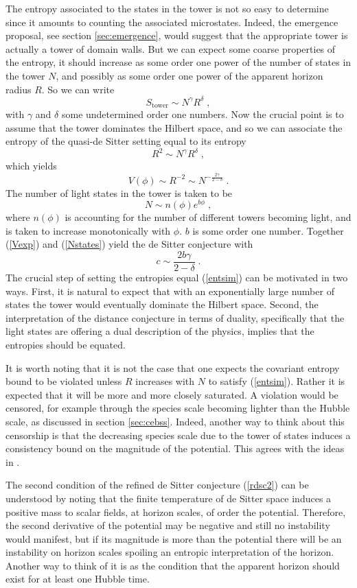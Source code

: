 \documentclass[11pt,a4paper]{article}
\numberwithin{equation}{section}
\numberwithin{table}{section}\setlength{\multlinegap}{25pt}
\newcommand{\be}{\begin{equation}}
\newcommand{\ee}{\end{equation}}
\begin{document}
{The entropy associated to the states in the tower is not so easy to determine since it amounts to counting the associated microstates. Indeed, the emergence proposal, see section \ref{sec:emergence}, would suggest that the appropriate tower is actually a tower of domain walls. But we can expect some coarse properties of the entropy, it should increase as some order one power of the number of states in the tower $N$, and possibly as some order one power of the apparent horizon radius $R$. So we can write
\be
S_{\mathrm{tower}} \sim N^{\gamma} R^{\delta} \;,
\ee
with $\gamma$ and $\delta$ some undetermined order one numbers. Now the crucial point is to assume that the tower dominates the Hilbert space, and so we can associate the entropy of the quasi-de Sitter setting equal to its entropy
\be
R^2 \sim N^{\gamma} R^{\delta} \;,
\label{entsim}
\ee
which yields
\be
V\left( \phi \right) \sim R^{-2} \sim N^{-\frac{2\gamma}{2-\delta}}\;.
\label{Vexp}
\ee
The number of light states in the tower is taken to be
\be
N \sim n\left( \phi \right) e^{b \phi} \;,
\label{Nstates}
\ee
where $n\left( \phi \right)$ is accounting for the number of different towers becoming light, and is taken to increase monotonically with $\phi$. $b$ is some order one number. Together (\ref{Vexp}) and (\ref{Nstates}) yield the de Sitter conjecture with 
\be
c \sim \frac{2b\gamma}{2-\delta} \;.
\ee
The crucial step of setting the entropies equal (\ref{entsim}) can be motivated in two ways. First, it is natural to expect that with an exponentially large number of states the tower would eventually dominate the Hilbert space. Second, the interpretation of the distance conjecture in terms of duality, specifically that the light states are offering a dual description of the physics, implies that the entropies should be equated. 

It is worth noting that it is not the case that one expects the covariant entropy bound to be violated unless $R$ increases with $N$ to satisfy (\ref{entsim}). Rather it is expected that it will be more and more closely saturated. A violation would be censored, for example through the species scale becoming lighter than the Hubble scale, as discussed in section \ref{sec:cebss}. Indeed, another way to think about this censorship is that the decreasing species scale due to the tower of states induces a consistency bound on the magnitude of the potential. This agrees with the ideas in \cite{Grimm:2018ohb,Heidenreich:2018kpg,talk-madrid,Hebecker:2018vxz}. 

The second condition of the refined de Sitter conjecture (\ref{rdsc2}) can be understood by noting that the finite temperature of de Sitter space induces a positive mass to scalar fields, at horizon scales, of order the potential. Therefore, the second derivative of the potential may be negative and still no instability would manifest, but if its magnitude is more than the potential there will be an instability on horizon scales spoiling an entropic interpretation of the horizon. Another way to think of it is as the condition that the apparent horizon should exist for at least one Hubble time.

}
\end{document}
